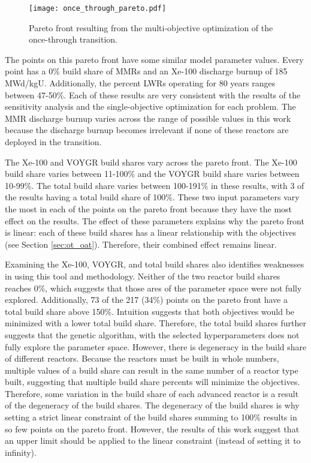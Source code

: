 \begin{figure}[h!][h!][h!]
    \centering 
    \texttt{[image: once\_through\_pareto.pdf]}
    \caption{Pareto front resulting from the multi-objective optimization 
    of the once-through transition.}
    \label{fig:once_through_pareto}
\end{figure}

The points on this pareto front have some similar model parameter values. 
Every point has a 0\% build share of \glspl{MMR} and an Xe-100 discharge 
burnup of 185 MWd/kgU. Additionally, the percent \glspl{LWR} operating 
for 80 years ranges between 47-50\%. Each of these results are very 
consistent with the results of the sensitivity analysis and the 
single-objective optimization for each problem. The \gls{MMR} discharge 
burnup varies 
across the range of possible values in this work because the discharge 
burnup becomes irrelevant if none of these reactors are deployed in the
transition.

The Xe-100 and VOYGR build shares vary across the pareto front. The Xe-100 
build share varies between 11-100\% and the VOYGR build share varies 
between 10-99\%. The total build share varies between 100-191\% in these 
results, with 3 of the results having a total build share of 100\%. 
These two input parameters vary the most in each of the points on 
the pareto front because they have the most effect on the results. The effect of 
these parameters explains why the pareto front is linear: each of these 
build shares has a linear relationship with the objectives (see Section 
\ref{sec:ot_oat}). Therefore, their combined effect remains linear.

Examining the Xe-100, VOYGR, and total build shares also identifies 
weaknesses in using this tool and methodology. Neither of the two reactor 
build shares reaches 0\%, which suggests that those ares of the parameter 
space were not fully explored. Additionally, 73 of the 217 (34\%) points 
on the pareto front have a total build share above 150\%. Intuition 
suggests that both objectives would be minimized with a lower total 
build share. Therefore, the total build shares further suggests that the 
genetic algorithm, with the selected hyperparameters does not fully 
explore the parameter space. 
However, there is degeneracy in the build share of different reactors. 
Because the reactors must be built in whole numbers, multiple values of 
a build share can result in the same number of a reactor type built, 
suggesting that multiple build share percents will minimize the 
objectives. Therefore, some variation in the build share of each 
advanced reactor is a result of the degeneracy of the build 
shares. The degeneracy of the build shares is why setting a strict 
linear constraint of the build shares summing to 100\% results in 
so few points on the pareto front. However, the results of this work 
suggest that an upper limit should be applied to the linear constraint 
(instead of setting it to infinity). 
